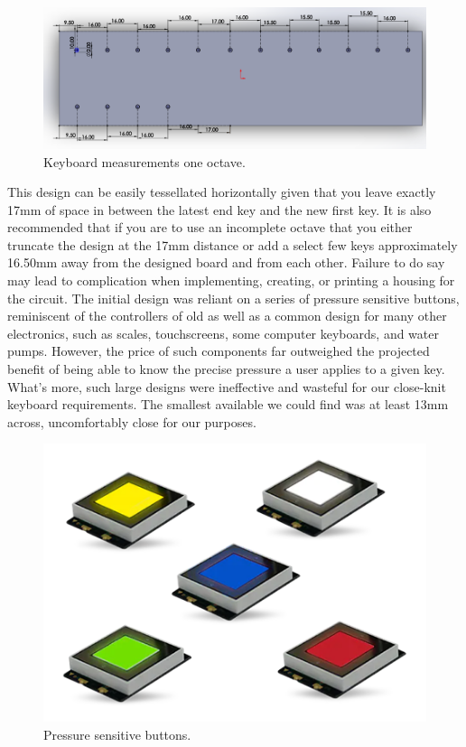 \begin{figure}[h!]
  \centering
  \includegraphics[width=\linewidth]{image/pcbdesign.png}
  \caption{Keyboard measurements one octave.}
  \label{fig:pcb_design_diagram}
\end{figure}

This design can be easily tessellated horizontally given that you leave exactly
17mm of space in between the latest end key and the new first key. It is also
recommended that if you are to use an incomplete octave that you either truncate
the design at the 17mm distance or add a select few keys approximately 16.50mm
away from the designed board and from each other. Failure to do say may lead to
complication when implementing, creating, or printing a housing for the circuit.
The initial design was reliant on a series of pressure sensitive buttons,
reminiscent of the controllers of old as well as a common design for many other
electronics, such as scales, touchscreens, some computer keyboards, and water
pumps. However, the price of such components far outweighed the projected
benefit of being able to know the precise pressure a user applies to a given
key. What’s more, such large designs were ineffective and wasteful for our
close-knit keyboard requirements. The smallest available we could find was at
least 13mm across, uncomfortably close for our purposes.

\begin{figure}[h!]
  \centering
  \includegraphics[width=\linewidth]{image/pressuresensitivebuttons.png}
  \caption{Pressure sensitive buttons.}
\end{figure}


